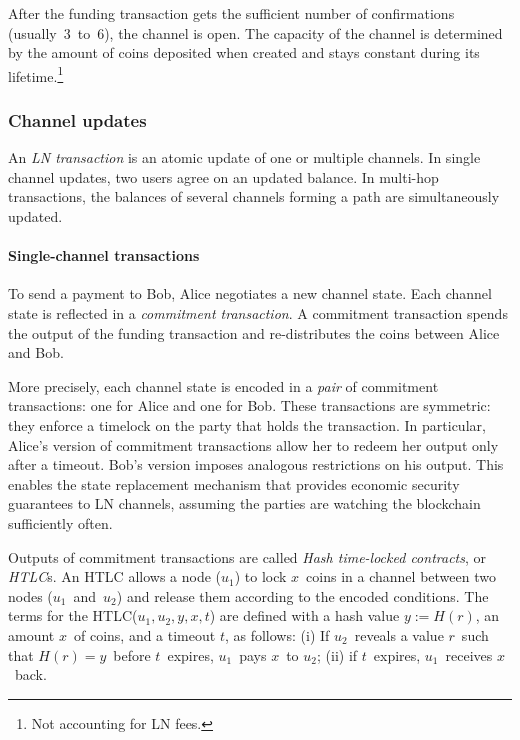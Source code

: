 After the funding transaction gets the sufficient number of confirmations (usually~$3$~to~$6$), the channel is open.
The capacity of the channel is determined by the amount of coins deposited when created and stays constant during its lifetime.\footnote{Not accounting for LN fees.}

\subsubsection*{Channel updates}

An \textit{LN transaction} is an atomic update of one or multiple channels.
In single channel updates, two users agree on an updated balance.
In multi-hop transactions, the balances of several channels forming a path are simultaneously updated.

\paragraph{Single-channel transactions}

To send a payment to Bob, Alice negotiates a new channel state.
Each channel state is reflected in a \textit{commitment transaction}.
A commitment transaction spends the output of the funding transaction and re-distributes the coins between Alice and Bob.

More precisely, each channel state is encoded in a \textit{pair} of commitment transactions: one for Alice and one for Bob.
These transactions are symmetric: they enforce a timelock on the party that holds the transaction.
In particular, Alice's version of commitment transactions allow her to redeem her output only after a timeout.
Bob's version imposes analogous restrictions on his output.
This enables the state replacement mechanism that provides economic security guarantees to LN channels, assuming the parties are watching the blockchain sufficiently often.

Outputs of commitment transactions are called \textit{Hash time-locked contracts}, or \textit{HTLC}s.
An HTLC allows a node ($u_1$) to lock $x$~coins in a channel between two nodes ($u_1$~and~$u_2$) and release them according to the encoded conditions.
The terms for the HTLC($u_1, u_2, y, x, t$) are defined with a hash value $y := H(r)$, an amount $x$~of coins, and a timeout $t$, as follows: 
(i) If $u_2$~reveals a value $r$~such that $H(r) = y$~before $t$~expires, $u_1$~pays $x$~to $u_2$; 
(ii) if $t$~expires, $u_1$~receives $x$~back.

